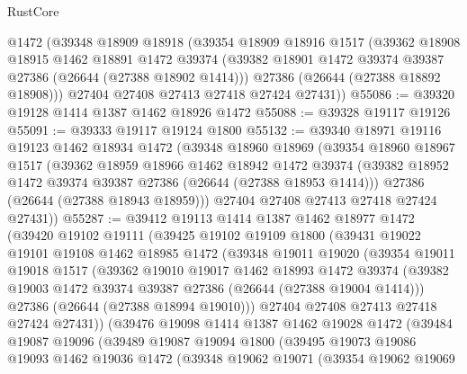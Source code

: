 \begin{lexlean}{RustCore}
\begin{coremodule}
    @1472
    (@39348
      @18909
      @18918
      (@39354
        @18909
        @18916
        @1517
        (@39362
          @18908
          @18915
          @1462
          @18891
          @1472
          @39374
          (@39382 @18901 @1472 @39374 @39387 @27386 (@26644 (@27388 @18902 @1414)))
          @27386
          (@26644 (@27388 @18892 @18908)))
        @27404
        @27408
        @27413
        @27418
        @27424
        @27431))
@55086 := @39320 @19128 @1414 @1387 @1462 @18926 @1472
@55088 := @39328 @19117 @19126
@55091 := @39333 @19117 @19124 @1800
@55132 := @39340
    @18971
    @19116
    @19123
    @1462
    @18934
    @1472
    (@39348
      @18960
      @18969
      (@39354
        @18960
        @18967
        @1517
        (@39362
          @18959
          @18966
          @1462
          @18942
          @1472
          @39374
          (@39382 @18952 @1472 @39374 @39387 @27386 (@26644 (@27388 @18953 @1414)))
          @27386
          (@26644 (@27388 @18943 @18959)))
        @27404
        @27408
        @27413
        @27418
        @27424
        @27431))
@55287 := @39412
    @19113
    @1414
    @1387
    @1462
    @18977
    @1472
    (@39420
      @19102
      @19111
      (@39425
        @19102
        @19109
        @1800
        (@39431
          @19022
          @19101
          @19108
          @1462
          @18985
          @1472
          (@39348
            @19011
            @19020
            (@39354
              @19011
              @19018
              @1517
              (@39362
                @19010
                @19017
                @1462
                @18993
                @1472
                @39374
                (@39382 @19003 @1472 @39374 @39387 @27386 (@26644 (@27388 @19004 @1414)))
                @27386
                (@26644 (@27388 @18994 @19010)))
              @27404
              @27408
              @27413
              @27418
              @27424
              @27431))
          (@39476
            @19098
            @1414
            @1387
            @1462
            @19028
            @1472
            (@39484
              @19087
              @19096
              (@39489
                @19087
                @19094
                @1800
                (@39495
                  @19073
                  @19086
                  @19093
                  @1462
                  @19036
                  @1472
                  (@39348
                    @19062
                    @19071
                    (@39354
                      @19062
                      @19069

\end{coremodule}
\end{lexlean}
